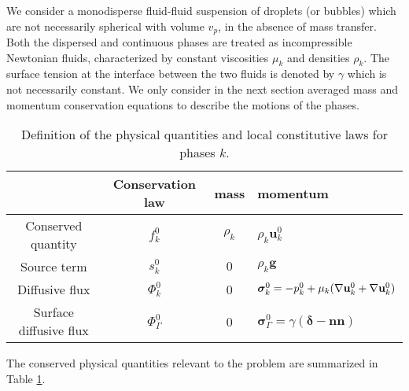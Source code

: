 We consider a monodisperse fluid-fluid suspension of droplets (or bubbles) which are not necessarily spherical with volume \( v_p \), in the absence of mass transfer. 
Both the dispersed and continuous phases are treated as incompressible Newtonian fluids, characterized by constant viscosities \( \mu_k \) and densities \( \rho_k \). 
The surface tension at the interface between the two fluids is denoted by \( \gamma \) which is not necessarily constant.%
We only consider in the next section averaged mass and momentum conservation equations to describe the motions of the phases. 
\begin{table}
    \centering
    \begin{tabular}{|c|ccl|}\hline
    & Conservation law & mass & momentum \\ \hline
    Conserved quantity & $f_k^0$  & $\rho_k$ & $\rho_k \textbf{u}_k^0$ \\
    Source term & $s_k^0$  & $0$ & $\rho_k \textbf{g}$ \\
    Diffusive flux & $\Phi_k^0$ & 0 & $\bm\sigma_k^0 = -p_k^0 + \mu_k (\mathbf{\nabla} \textbf{u}_k^0 + \mathbf{\nabla} \textbf{u}_k^0)$ \\
    Surface diffusive flux & $\Phi_\Gamma^0$ & 0 & $\bm\sigma_\Gamma^0 = \gamma (\bm\delta - \textbf{nn})$ \\\hline
    \end{tabular}

    \caption{Definition of the physical quantities and local constitutive laws for phases $k$.}
    \label{tab:qte_Newtonian}
\end{table}
The conserved physical quantities  relevant to the problem are summarized in Table \ref{tab:qte_Newtonian}.




